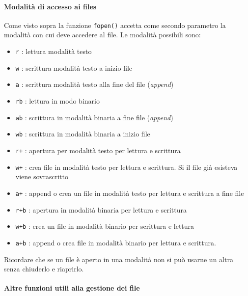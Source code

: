 \documentclass[
  paper=a4,
  oneside  ,captions=tableheading
]{scrbook}
\newcommand{\passthrough}[1]{#1}
\providecommand{\tightlist}{%
  \setlength{\itemsep}{0pt}\setlength{\parskip}{0pt}}
\begin{document}
\hypertarget{modalituxe0-di-accesso-ai-files}{%
\paragraph{Modalità di accesso ai
files}\label{modalituxe0-di-accesso-ai-files}}

Come visto sopra la funzione \passthrough{\lstinline!fopen()!} accetta
come secondo parametro la modalità con cui deve accedere al file. Le
modalità possibili sono:

\begin{itemize}
\tightlist
\item
  \passthrough{\lstinline!r!} : lettura modalità testo
\item
  \passthrough{\lstinline!w!} : scrittura modalità testo a inizio file
\item
  \passthrough{\lstinline!a!} : scrittura modalità testo alla fine del
  file (\emph{append})
\item
  \passthrough{\lstinline!rb!} : lettura in modo binario
\item
  \passthrough{\lstinline!ab!} : scrittura in modalità binaria a fine
  file (\emph{append})
\item
  \passthrough{\lstinline!wb!} : scrittura in modalità binaria a inizio
  file
\item
  \passthrough{\lstinline!r+!} : apertura per modalità testo per lettura
  e scrittura
\item
  \passthrough{\lstinline!w+!} : crea file in modalità testo per lettura
  e scrittura. Si il file già esisteva viene sovrascritto
\item
  \passthrough{\lstinline!a+!} : append o crea un file in modalità testo
  per lettura e scrittura a fine file
\item
  \passthrough{\lstinline!r+b!} : apertura in modalità binaria per
  lettura e scrittura
\item
  \passthrough{\lstinline!w+b!} : crea un file in modalità binario per
  scrittura e lettura
\item
  \passthrough{\lstinline!a+b!} : append o crea file in modalità binario
  per lettura e scrittura.
\end{itemize}

Ricordare che se un file è aperto in una modalità non si può usarne un
altra senza chiuderlo e riaprirlo.

\hypertarget{altre-funzioni-utili-alla-gestione-dei-file}{%
\paragraph{Altre funzioni utili alla gestione dei
file}\label{altre-funzioni-utili-alla-gestione-dei-file}}
\end{document}
